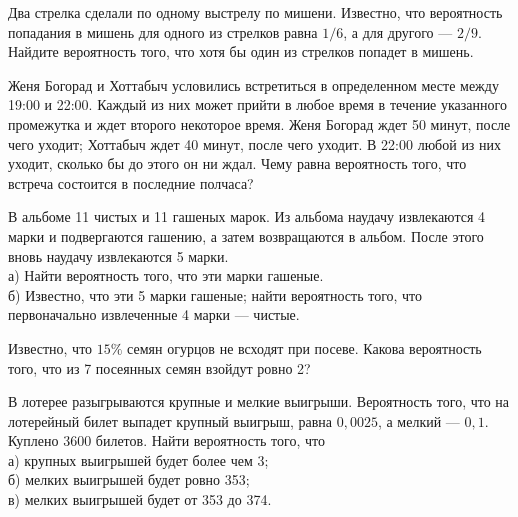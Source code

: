 \newpage\setcounter{zad}{0}



\begin{zkrW}{20}\noindent 
	Два стрелка сделали по одному выстрелу по мишени. Известно, что вероятность попадания в мишень для одного из стрелков равна $1/6$, а для другого --- $2/9$. Найдите вероятность того, что хотя бы один из стрелков попадет в мишень.
 
\end{zkrW}

\begin{zkrW}{20}\noindent 
	Женя Богорад и Хоттабыч условились встретиться в определенном месте между 19:00 и 22:00. Каждый из них может прийти в любое время в течение указанного промежутка и ждет второго некоторое время. Женя Богорад ждет 50 минут, после чего уходит; Хоттабыч ждет 40 минут, после чего уходит. В 22:00 любой из них уходит, сколько бы до этого он ни ждал. Чему равна вероятность того, что встреча состоится в последние полчаса?
 
\end{zkrW}

\begin{zkrW}{20}\noindent 
	В альбоме 11 чистых и 11 гашеных марок. Из альбома наудачу извлекаются 4 марки и подвергаются гашению, а затем возвращаются в альбом. После этого вновь наудачу извлекаются 5 марки. \\ \indent а) Найти вероятность того, что эти марки гашеные. \\ \indent б) Известно, что эти 5 марки гашеные; найти вероятность того, что первоначально извлеченные 4 марки --- чистые.
 
\end{zkrW}

\begin{zkrW}{20}\noindent 
	Известно, что $15\%$ семян огурцов не всходят при посеве. Какова вероятность того, что из 7 посеянных семян взойдут ровно 2?
 
\end{zkrW}

\begin{zkrW}{20}\noindent 
	В лотерее разыгрываются крупные и мелкие выигрыши. Вероятность того, что на лотерейный билет выпадет крупный выигрыш, равна $0{,}0025$, а мелкий --- $0{,}1$. Куплено 3600 билетов. Найти вероятность того, что \\ \indent а) крупных выигрышей будет более чем 3; \\ \indent б) мелких выигрышей будет ровно 353; \\ \indent в) мелких выигрышей будет от 353 до 374.
 
\end{zkrW}

